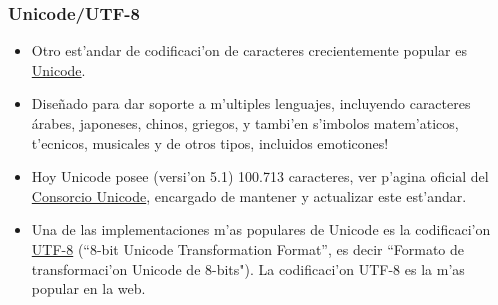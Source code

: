 \documentclass{beamer}
\begin{document}
\begin{frame}[fragile]\frametitle{Unicode/UTF-8}
\begin{itemize}
\item Otro est'andar de codificaci'on de caracteres crecientemente popular es \href{https://es.wikipedia.org/wiki/Unicode}{Unicode}. 
\item Dise\~nado para dar soporte a m'ultiples lenguajes, incluyendo caracteres árabes, japoneses, chinos, griegos, y tambi'en s'imbolos matem'aticos, t'ecnicos, musicales y de otros tipos, incluidos emoticones! 
\item Hoy Unicode posee (versi'on 5.1) 100.713 caracteres, ver p'agina oficial del \href{http://www.unicode.org/charts/}{Consorcio Unicode}, encargado de mantener y actualizar este est'andar. 
\item Una de las implementaciones m'as populares de Unicode es la codificaci'on \href{https://es.wikipedia.org/wiki/UTF-8}{UTF-8} (``8-bit Unicode Transformation Format'', es decir ``Formato de transformaci'on Unicode de 8-bits"). La codificaci'on UTF-8 es la m'as popular en la web.
\end{itemize}
\end{frame}



\end{document}
